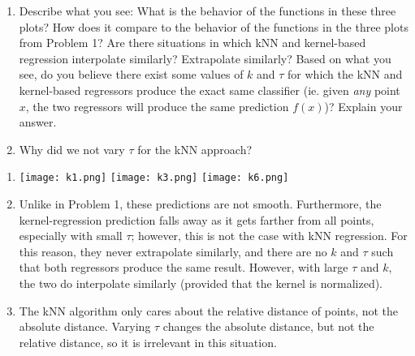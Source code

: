 \documentclass[submit]{harvardml}
\begin{document}
\begin{problem}
\begin{enumerate}
\item Describe what you see: What is the behavior of the functions in
  these three plots?  How does it compare to the behavior of the
  functions in the three plots from Problem 1?  Are there situations
  in which kNN and kernel-based regression interpolate similarly?
  Extrapolate similarly?  Based on what you see, do you believe there
  exist some values of $k$ and $\tau$ for which the kNN and kernel-based regressors produce the exact same classifier (ie. given \textit{any} point $x$, the two regressors will produce the same prediction $f(x)$)? Explain your answer.
  
\item Why did we not vary $\tau$ for the kNN approach?

\end{enumerate}

\end{problem}

\begin{enumerate}
    \item \texttt{[image: k1.png]}
    \texttt{[image: k3.png]}
    \texttt{[image: k6.png]}
    
    \item Unlike in Problem 1, these predictions are not smooth.  Furthermore, the kernel-regression prediction falls away as it gets farther from all points, especially with small $\tau$; however, this is not the case with kNN regression.  For this reason, they never extrapolate similarly, and there are no $k$ and $\tau$ such that both regressors produce the same result.  However, with large $\tau$ and $k$, the two do interpolate similarly (provided that the kernel is normalized).
    
    \item The kNN algorithm only cares about the relative distance of points, not the absolute distance.  Varying $\tau$ changes the absolute distance, but not the relative distance, so it is irrelevant in this situation.
\end{enumerate}


\newpage 

\end{document}
